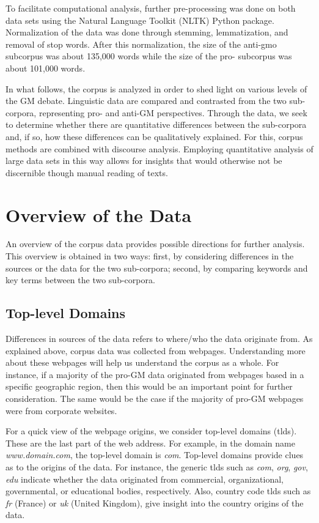 To facilitate computational analysis, further pre-processing was done on both data sets using the Natural Language Toolkit (NLTK) Python package. Normalization of the data was done through stemming, lemmatization, and removal of stop words. After this normalization, the size of the anti-gmo subcorpus was about 135,000 words while the size of the pro- subcorpus was about 101,000 words. 

In what follows, the corpus is analyzed in order to shed light on various levels of the GM debate. Linguistic data are compared and contrasted from the two sub-corpora, representing pro- and anti-GM perspectives. Through the data, we seek to determine whether there are quantitative differences between the sub-corpora and, if so, how these differences can be qualitatively explained. For this, corpus methods are combined with discourse analysis. Employing quantitative analysis of large data sets in this way allows for insights that would otherwise not be discernible though manual reading of texts.

\section{Overview of the Data}

An overview of the corpus data provides possible directions for further analysis. This overview is obtained in two ways: first, by considering differences in the sources or the data for the two sub-corpora; second, by comparing keywords and key terms between the two sub-corpora.    

\subsection{Top-level Domains}

Differences in sources of the data refers to where/who the data originate from. As explained above, corpus data was collected from webpages. Understanding more about these webpages will help us understand the corpus as a whole. For instance, if a majority of the pro-GM data originated from webpages based in a specific geographic region, then this would be an important point for further consideration. The same would be the case if the majority of pro-GM webpages were from corporate websites. 

For a quick view of the webpage origins, we consider top-level domains (tlds). These are the last part of the web address. For example, in the domain name \textit{www.domain.com}, the top-level domain is \textit{com}. Top-level domains provide clues as to the origins of the data. For instance, the generic tlds such as \textit{com}, \textit{org}, \textit{gov}, \textit{edu} indicate whether the data originated from commercial, organizational, governmental, or educational bodies, respectively. Also, country code tlds such as \textit{fr} (France) or \textit{uk} (United Kingdom), give insight into the country origins of the data.   

